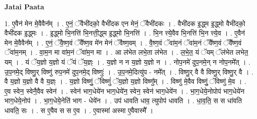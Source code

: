 \documentclass[17pt]{extarticle}
\begin{document}
\textbf{Jatai Paata} \newline

1. ए॒वैन॑ मेन मे॒वैवैन᳚म् । . ए॒नं॒ ॅवैभी॑दको॒ वैभी॑दक एन मेनं॒ ॅवैभी॑दकः । . वैभी॑दक इ॒द्ध्म इ॒द्ध्मो वैभी॑दको॒ वैभी॑दक इ॒द्ध्मः । . इ॒द्ध्मो भि॒नत्ति॑ भि॒नत्ती॒द्ध्म इ॒द्ध्मो भि॒नत्ति॑ । . भि॒न त्त्ये॒वैव भि॒नत्ति॑ भि॒न त्त्ये॒व । . ए॒वैन॑ मेन मे॒वैवैन᳚म् । . ए॒नं॒ ॅवै॒ष्ण॒वं ॅवै᳚ष्ण॒व मे॑न मेनं ॅवैष्ण॒वम् । . वै॒ष्ण॒वं ॅवा॑म॒नं ॅवा॑म॒नं ॅवै᳚ष्ण॒वं ॅवै᳚ष्ण॒वं ॅवा॑म॒नम् । . वा॒म॒न मा वा॑म॒नं ॅवा॑म॒न मा । . आ ल॑भेत लभे॒ता ल॑भेत । . ल॒भे॒त॒ यं ॅयम् ॅल॑भेत लभेत॒ यम् । . यं ॅय॒ज्ञो य॒ज्ञो यं ॅयं ॅय॒ज्ञ्ः । . य॒ज्ञो न न य॒ज्ञो य॒ज्ञो न । . नोप॒नमे॑ दुप॒नमे॒न् न नोप॒नमे᳚त् । . उ॒प॒नमे॒द् विष्णु॒र् विष्णु॑ रुप॒नमे॑ दुप॒नमे॒द् विष्णुः॑ । . उ॒प॒नमे॒दित्यु॑प - नमे᳚त् । . विष्णु॒र् वै वै विष्णु॒र् विष्णु॒र् वै । . वै य॒ज्ञो य॒ज्ञो वै वै य॒ज्ञ्ः । . य॒ज्ञो विष्णुं॒ ॅविष्णुं॑ ॅय॒ज्ञो य॒ज्ञो विष्णु᳚म् । . विष्णु॑ मे॒वैव विष्णुं॒ ॅविष्णु॑ मे॒व । . ए॒व स्वेन॒ स्वेनै॒वैव स्वेन॑ । . स्वेन॑ भाग॒धेये॑न भाग॒धेये॑न॒ स्वेन॒ स्वेन॑ भाग॒धेये॑न । . भा॒ग॒धेये॒नोपोप॑ भाग॒धेये॑न भाग॒धेये॒नोप॑ । . भा॒ग॒धेये॒नेति॑ भाग - धेये॑न । . उप॑ धावति धाव॒ त्युपोप॑ धावति । . धा॒व॒ति॒ स स धा॑वति धावति॒ सः । . स ए॒वैव स स ए॒व । . ए॒वास्मा॑ अस्मा ए॒वैवास्मै᳚ । \newline
\end{document}
